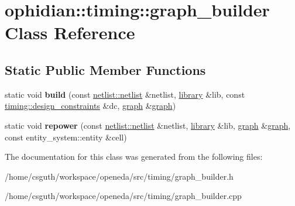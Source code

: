 \hypertarget{classophidian_1_1timing_1_1graph__builder}{\section{ophidian\-:\-:timing\-:\-:graph\-\_\-builder Class Reference}
\label{classophidian_1_1timing_1_1graph__builder}
}
\subsection*{Static Public Member Functions}
\begin{DoxyCompactItemize}
\item 
\hypertarget{classophidian_1_1timing_1_1graph__builder_a3e2366f8b89d08c41ebfbfa3d1456266}{static void {\bfseries build} (const \hyperlink{classophidian_1_1netlist_1_1netlist}{netlist\-::netlist} \&netlist, \hyperlink{classophidian_1_1timing_1_1library}{library} \&lib, const \hyperlink{structophidian_1_1timing_1_1design__constraints}{timing\-::design\-\_\-constraints} \&dc, \hyperlink{classophidian_1_1timing_1_1graph}{graph} \&\hyperlink{classophidian_1_1timing_1_1graph}{graph})}\label{classophidian_1_1timing_1_1graph__builder_a3e2366f8b89d08c41ebfbfa3d1456266}

\item 
\hypertarget{classophidian_1_1timing_1_1graph__builder_aafc22563874977d6859b0734e4433d67}{static void {\bfseries repower} (const \hyperlink{classophidian_1_1netlist_1_1netlist}{netlist\-::netlist} \&netlist, \hyperlink{classophidian_1_1timing_1_1library}{library} \&lib, \hyperlink{classophidian_1_1timing_1_1graph}{graph} \&\hyperlink{classophidian_1_1timing_1_1graph}{graph}, const entity\-\_\-system\-::entity \&cell)}\label{classophidian_1_1timing_1_1graph__builder_aafc22563874977d6859b0734e4433d67}

\end{DoxyCompactItemize}


The documentation for this class was generated from the following files\-:\begin{DoxyCompactItemize}
\item 
/home/csguth/workspace/openeda/src/timing/graph\-\_\-builder.\-h\item 
/home/csguth/workspace/openeda/src/timing/graph\-\_\-builder.\-cpp\end{DoxyCompactItemize}
